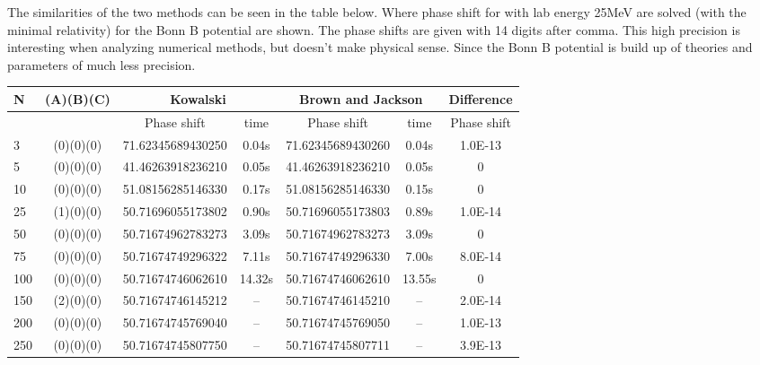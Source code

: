 The similarities of the two methods can be seen in the table below. Where phase shift for  
with lab energy 25MeV
are solved (with the minimal relativity) for the Bonn B potential are shown. %
The phase shifts are given with 14 digits after comma. 
This high precision is interesting when analyzing numerical methods, but
doesn't make  physical sense. Since the Bonn B potential is build up of
theories and parameters of much less precision.
\nl
\begin{flushleft}
\begin{table}
\begin{tabular}{|l|c|c|c|c|c|c|}%
\hline
N&  (A)(B)(C)  &  \multicolumn{2}{|c|}{Kowalski}  & \multicolumn{2}{|c|}{Brown and Jackson} & Difference  \\
\hline
            &          &  Phase shift & time              &       Phase shift    &  time       & Phase shift    \\
\hline
3           &(0)(0)(0) &   71.62345689430250 & 0.04s      & 71.62345689430260    & 0.04s       & 1.0E-13       \\
\hline
5           &(0)(0)(0) &   41.46263918236210 & 0.05s      & 41.46263918236210    & 0.05s       & 0            \\
\hline
10          &(0)(0)(0) &   51.08156285146330 & 0.17s      & 51.08156285146330    & 0.15s       & 0            \\
\hline
25          &(1)(0)(0) &   50.71696055173802 & 0.90s      & 50.71696055173803    & 0.89s       & 1.0E-14          \\ 
\hline
50          &(0)(0)(0) &   50.71674962783273 & 3.09s      & 50.71674962783273    & 3.09s       & 0        \\
\hline
75          &(0)(0)(0) &   50.71674749296322 & 7.11s      & 50.71674749296330    & 7.00s       & 8.0E-14     \\
\hline
100         &(0)(0)(0) &   50.71674746062610 & 14.32s     & 50.71674746062610    & 13.55s      & 0            \\
\hline
150         &(2)(0)(0) &   50.71674746145212 &     --     & 50.71674746145210    &     --      & 2.0E-14        \\
\hline
200         &(0)(0)(0) &   50.71674745769040 &     --     & 50.71674745769050    &     --      & 1.0E-13        \\
\hline
250         &(0)(0)(0) &   50.71674745807750 &     --     & 50.71674745807711    &     --      & 3.9E-13        \\

\end{tabular}
\end{table}
\end{flushleft}
